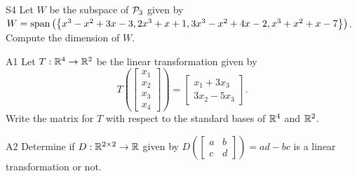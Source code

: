 \documentclass{sbgLAsemi}
\begin{document}
\begin{problem}{S4}
Let $W$ be the subspace of $\P_3$ given by $W={\rm span}\left( \left\{ x^3-x^2+3x-3, 2x^3+x+1, 3x^3-x^2+4x-2, x^3+x^2+x-7\right\}\right)$.  Compute the dimension of $W$.
\end{problem}

\begin{problem}{A1}
Let $T: \IR^4 \rightarrow \IR^2$ be the linear transformation given by $$T\left(\begin{bmatrix} x_1 \\ x_2 \\ x_3 \\ x_4 \end{bmatrix} \right) = \begin{bmatrix} x_1+3x_3 \\ 3x_2-5x_3 \end{bmatrix}.$$ Write the matrix for $T$ with respect to the standard bases of $\IR^4$ and $\IR^2$.
\end{problem}

\begin{problem}{A2}
Determine if $D: \IR^{2\times 2} \rightarrow \IR$ given by $D\left(\begin{bmatrix} a & b \\ c & d \end{bmatrix} \right) = ad-bc$ is a linear transformation or not.
\end{problem}
\end{document}
